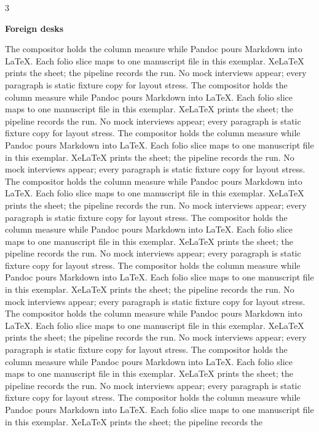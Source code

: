 \documentclass[
]{article}
\begin{document}
\begin{multicols}{3}

\textbf{Foreign desks}

The compositor holds the column measure while Pandoc pours Markdown into
LaTeX. Each folio slice maps to one manuscript file in this exemplar.
XeLaTeX prints the sheet; the pipeline records the run. No mock
interviews appear; every paragraph is static fixture copy for layout
stress. The compositor holds the column measure while Pandoc pours
Markdown into LaTeX. Each folio slice maps to one manuscript file in
this exemplar. XeLaTeX prints the sheet; the pipeline records the run.
No mock interviews appear; every paragraph is static fixture copy for
layout stress. The compositor holds the column measure while Pandoc
pours Markdown into LaTeX. Each folio slice maps to one manuscript file
in this exemplar. XeLaTeX prints the sheet; the pipeline records the
run. No mock interviews appear; every paragraph is static fixture copy
for layout stress. The compositor holds the column measure while Pandoc
pours Markdown into LaTeX. Each folio slice maps to one manuscript file
in this exemplar. XeLaTeX prints the sheet; the pipeline records the
run. No mock interviews appear; every paragraph is static fixture copy
for layout stress. The compositor holds the column measure while Pandoc
pours Markdown into LaTeX. Each folio slice maps to one manuscript file
in this exemplar. XeLaTeX prints the sheet; the pipeline records the
run. No mock interviews appear; every paragraph is static fixture copy
for layout stress. The compositor holds the column measure while Pandoc
pours Markdown into LaTeX. Each folio slice maps to one manuscript file
in this exemplar. XeLaTeX prints the sheet; the pipeline records the
run. No mock interviews appear; every paragraph is static fixture copy
for layout stress. The compositor holds the column measure while Pandoc
pours Markdown into LaTeX. Each folio slice maps to one manuscript file
in this exemplar. XeLaTeX prints the sheet; the pipeline records the
run. No mock interviews appear; every paragraph is static fixture copy
for layout stress. The compositor holds the column measure while Pandoc
pours Markdown into LaTeX. Each folio slice maps to one manuscript file
in this exemplar. XeLaTeX prints the sheet; the pipeline records the
run. No mock interviews appear; every paragraph is static fixture copy
for layout stress. The compositor holds the column measure while Pandoc
pours Markdown into LaTeX. Each folio slice maps to one manuscript file
in this exemplar. XeLaTeX prints the sheet; the pipeline records the

\end{multicols}
\end{document}
